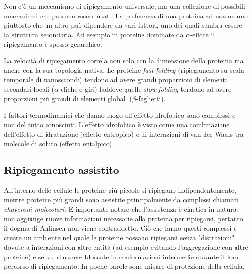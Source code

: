 {{Non c'è un meccanismo di ripiegamento universale, ma una collezione di possibili meccanismi che possono essere usati. La preferenza di una proteina ad usarne uno piuttosto che un altro può dipendere da vari fattori, uno dei quali sembra essere la struttura secondaria. Ad esempio in proteine dominate da $\alpha$-eliche il ripiegamento è spesso gerarchico. 

\par La velocità di ripiegamento correla non solo con la dimensione della proteina ma anche con la sua topologia nativa. Le proteine \textit{fast-folding} (ripiegamento su scala temporale di nanosecondi) tendono ad avere grandi proporzioni di elementi secondari locali ($\alpha$-eliche e giri) laddove quelle \textit{slow-folding} tendono ad avere proporzioni più grandi di elementi globali ($\beta$-foglietti).

\par I fattori termodinamici che danno luogo all’effetto idrofobico sono complessi e non del tutto conosciuti. L’effetto idrofobico è visto come una combinazione dell’effetto di idratazione (effetto entropico) e di interazioni di van der Waals tra molecole di soluto (effetto entalpico).

}
	
\subsection{Ripiegamento assistito}
All'interno delle cellule le proteine più piccole si ripiegano indipendentemente, mentre proteine più grandi sono assistite principalmente da complessi chiamati \textit{chaperoni molecolari}. È  importante notare che l'assistenza è cinetica in natura: non aggiunge nuove informazioni necessarie alla proteina per ripiegarsi, pertanto il dogma di Anfinsen non viene contraddetto. Ciò che fanno questi complessi è creare un ambiente nel quale le proteine possano ripiegarsi senza "distrazioni" dovute a interazioni con altre entità (ad esempio evitando l'aggregazione con altre proteine) e senza rimanere bloccate in conformazioni intermedie durante il loro percorso di ripiegamento. In poche parole sono misure di protezione della cellula. 

}
